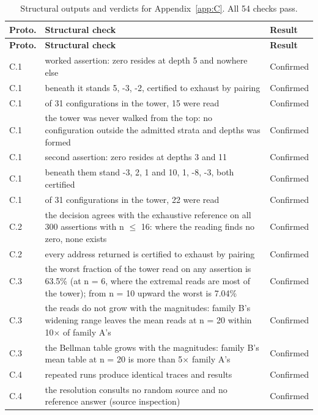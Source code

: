 \documentclass[pdflatex,sn-mathphys-num]{sn-jnl}
\theoremstyle{thmstyleone}%
\theoremstyle{thmstyletwo}%
\theoremstyle{thmstylethree}%
\begin{document}
\begin{appendices}
\begingroup\small\renewcommand{\arraystretch}{1.25}
\begin{longtable}{@{} p{} p{} p{} @{}}
\caption{Structural outputs and verdicts for Appendix~\ref{app:C}. All 54 checks pass.}\label{tab:appC_results}\\
\toprule
\textbf{Proto.} & \textbf{Structural check} & \textbf{Result} \\
\midrule
\endfirsthead
\toprule
\textbf{Proto.} & \textbf{Structural check} & \textbf{Result} \\
\midrule
\endhead
\bottomrule
\endfoot
C.1 & worked assertion: zero resides at depth 5 and nowhere else & Confirmed \\
C.1 & beneath it stands {5, -3, -2}, certified to exhaust by pairing & Confirmed \\
C.1 & of 31 configurations in the tower, 15 were read & Confirmed \\
C.1 & the tower was never walked from the top: no configuration outside the admitted strata and depths was formed & Confirmed \\
C.1 & second assertion: zero resides at depths 3 and 11 & Confirmed \\
C.1 & beneath them stand {-3, 2, 1} and {10, 1, -8, -3}, both certified & Confirmed \\
C.1 & of 31 configurations in the tower, 22 were read & Confirmed \\
C.2 & the decision agrees with the exhaustive reference on all 300 assertions with n $\le$ 16: where the reading finds no zero, none exists & Confirmed \\
C.2 & every address returned is certified to exhaust by pairing & Confirmed \\
C.3 & the worst fraction of the tower read on any assertion is 63.5\% (at n = 6, where the extremal reads are most of the tower); from n = 10 upward the worst is 7.04\% & Confirmed \\
C.3 & the reads do not grow with the magnitudes: family B's widening range leaves the mean reads at n = 20 within 10$\times$ of family A's & Confirmed \\
C.3 & the Bellman table grows with the magnitudes: family B's mean table at n = 20 is more than 5$\times$ family A's & Confirmed \\
C.4 & repeated runs produce identical traces and results & Confirmed \\
C.4 & the resolution consults no random source and no reference answer (source inspection) & Confirmed \\

\end{longtable}
\end{appendices}
\end{document}
